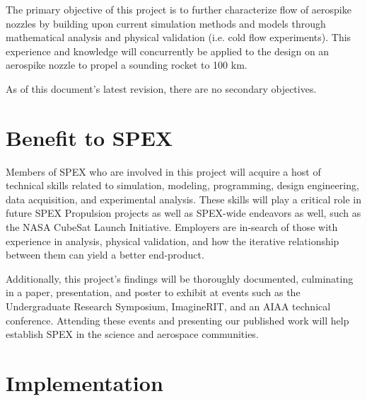 \documentclass[conference]{IEEEtran} %
\begin{document}
	The primary objective of this project is to further characterize flow of aerospike nozzles by building upon current simulation methods and models through mathematical analysis and physical validation (i.e. cold flow experiments). This experience and knowledge will concurrently be applied to the design on an aerospike nozzle to propel a sounding rocket to 100 km. 
	
	As of this document's latest revision, there are no secondary objectives.
	
	
	
	\section{Benefit to SPEX}
	\label{sec:benefit}
	
	Members of SPEX who are involved in this project will acquire a host of technical skills related to simulation, modeling, programming, design engineering, data acquisition, and experimental analysis. These skills will play a critical role in future SPEX Propulsion projects as well as SPEX-wide endeavors as well, such as the NASA CubeSat Launch Initiative. Employers are in-search of those with experience in analysis, physical validation, and how the iterative relationship between them can yield a better end-product.
	
	Additionally, this project's findings will be thoroughly documented, culminating in a paper, presentation, and poster to exhibit at events such as the Undergraduate Research Symposium, ImagineRIT, and an AIAA technical conference. Attending these events and presenting our published work will help establish SPEX in the science and aerospace communities.
	
	\section{Implementation}
	\label{sec:implementation}
	
\end{document}
